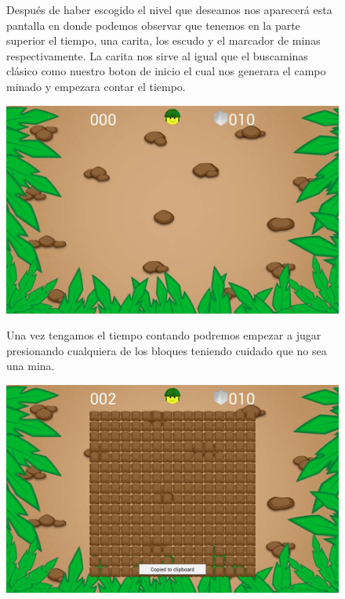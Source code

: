 \documentclass[11pt]{article}
\begin{document}
\begin{figure}[h!]
\begin{minipage}{0.5 \textwidth}
Después de haber escogido el nivel que deseamos nos aparecerá esta pantalla en donde podemos observar que tenemos en la parte superior el tiempo, una carita, los escudo y el marcador de minas respectivamente. La carita nos sirve al igual que el buscaminas clásico como nuestro boton de inicio el cual nos generara el campo minado y empezara contar el tiempo.
\end{minipage}
\hfill \begin{minipage}{6.5cm}
\begin{center}
 \includegraphics[width=1\textwidth]{images/screenshot3}
\end{center}
\end{minipage}
\end{figure}

\begin{figure}[h!]
\begin{minipage}{0.5 \textwidth}
Una vez tengamos el tiempo contando podremos empezar a jugar presionando cualquiera de los bloques teniendo cuidado que no sea una mina.
\end{minipage}
\hfill \begin{minipage}{6.5cm}
\begin{center}
 \includegraphics[width=1\textwidth]{images/screenshot4}
\end{center}
\end{minipage}
\end{figure}
\end{document}
